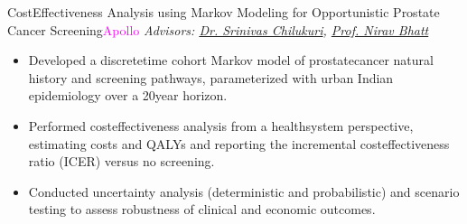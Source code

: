 \begin{projects}
\project
  {Cost\textendash Effectiveness Analysis using Markov Modeling for Opportunistic Prostate Cancer Screening}{\textcolor{magenta}{Apollo}}
  { \textit{Advisors: \href{https://www.apollohospitals.com/cancer-treatment-centres/cancer-hospital/chennai-apcc/radiation/dr-srinivas-chilukuri/}{Dr. Srinivas Chilukuri},  \href{https://www.iitmz.ac.in/schools/engineering-and-science/faculty/dr-nirav-bhatt}{Prof. Nirav Bhatt}} }
  {\begin{itemize}
  \setlength\itemsep{0.3em}
  \item Developed a discrete\textendash time cohort Markov model of prostate\textendash cancer natural history and screening pathways, parameterized with urban Indian epidemiology over a 20\textendash year horizon.
  \item Performed cost\textendash effectiveness analysis from a health\textendash system perspective, estimating costs and QALYs and reporting the incremental cost\textendash effectiveness ratio (ICER) versus no screening.
  \item Conducted uncertainty analysis (deterministic and probabilistic) and scenario testing to assess robustness of clinical and economic outcomes.
\end{itemize}}


  


    
\end{projects}

